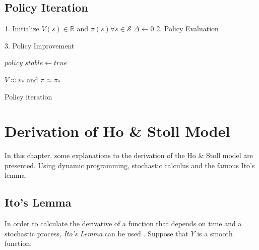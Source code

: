 \documentclass{kththesis}
\theoremstyle{definition}
\begin{document}
\section{Policy Iteration}
\LinesNumbered
\begin{algorithm}[H]
 \textsf{1. Initialize} \;
 $V(s) \in \mathbb{R}$ and  $\pi(s) \forall s\in \mathcal{S} $ \;
 $\Delta \leftarrow 0$ \;
 \textsf{2. Policy Evaluation}\;
 
 \textsf{3. Policy Improvement}\;
 
 $policy\_stable \leftarrow true$ \;
 
 \Return $V \approx v_{*}$ and $\pi \approx \pi_{*}$ \;
 \caption{Policy iteration}
 \label{alg1}
\end{algorithm}

\chapter{Derivation of Ho \& Stoll Model}\label{app:B}
In this chapter, some explanations to the derivation of the Ho \& Stoll model are presented. Using dynamic programming, stochastic calculus and the famous Ito's lemma.



\section{Ito's Lemma}
In order to calculate the derivative of a function that depends on time and a stochastic process, \textit{Ito's Lemma} can be used \parencite{o1995market}. Suppose that $Y$ is a smooth function:
\end{document}

